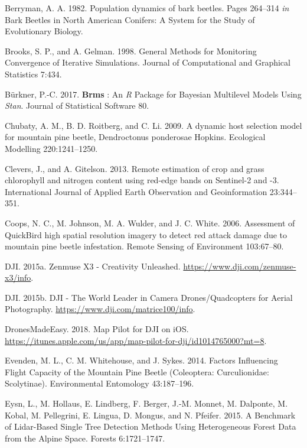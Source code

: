 \documentclass[]{article}
\begin{document}
\hypertarget{ref-berryman1982}{}
Berryman, A. A. 1982. Population dynamics of bark beetles. Pages
264--314 \emph{in} Bark Beetles in North American Conifers: A System for
the Study of Evolutionary Biology.

\hypertarget{ref-brooks1998}{}
Brooks, S. P., and A. Gelman. 1998. General Methods for Monitoring
Convergence of Iterative Simulations. Journal of Computational and
Graphical Statistics 7:434.

\hypertarget{ref-burkner2017}{}
Bürkner, P.-C. 2017. \textbf{Brms} : An \emph{R} Package for Bayesian
Multilevel Models Using \emph{Stan}. Journal of Statistical Software 80.

\hypertarget{ref-chubaty2009}{}
Chubaty, A. M., B. D. Roitberg, and C. Li. 2009. A dynamic host
selection model for mountain pine beetle, Dendroctonus ponderosae
Hopkins. Ecological Modelling 220:1241--1250.

\hypertarget{ref-clevers2013}{}
Clevers, J., and A. Gitelson. 2013. Remote estimation of crop and grass
chlorophyll and nitrogen content using red-edge bands on Sentinel-2 and
-3. International Journal of Applied Earth Observation and
Geoinformation 23:344--351.

\hypertarget{ref-coops2006}{}
Coops, N. C., M. Johnson, M. A. Wulder, and J. C. White. 2006.
Assessment of QuickBird high spatial resolution imagery to detect red
attack damage due to mountain pine beetle infestation. Remote Sensing of
Environment 103:67--80.

\hypertarget{ref-dji2015}{}
DJI. 2015a. Zenmuse X3 - Creativity Unleashed.
\url{https://www.dji.com/zenmuse-x3/info}.

\hypertarget{ref-dji2015a}{}
DJI. 2015b. DJI - The World Leader in Camera Drones/Quadcopters for
Aerial Photography. \url{https://www.dji.com/matrice100/info}.

\hypertarget{ref-dronesmadeeasy2018}{}
DronesMadeEasy. 2018. ‎Map Pilot for DJI on iOS.
\url{https://itunes.apple.com/us/app/map-pilot-for-dji/id1014765000?mt=8}.

\hypertarget{ref-evenden2014}{}
Evenden, M. L., C. M. Whitehouse, and J. Sykes. 2014. Factors
Influencing Flight Capacity of the Mountain Pine Beetle (Coleoptera:
Curculionidae: Scolytinae). Environmental Entomology 43:187--196.

\hypertarget{ref-eysn2015}{}
Eysn, L., M. Hollaus, E. Lindberg, F. Berger, J.-M. Monnet, M. Dalponte,
M. Kobal, M. Pellegrini, E. Lingua, D. Mongus, and N. Pfeifer. 2015. A
Benchmark of Lidar-Based Single Tree Detection Methods Using
Heterogeneous Forest Data from the Alpine Space. Forests 6:1721--1747.
\end{document}
